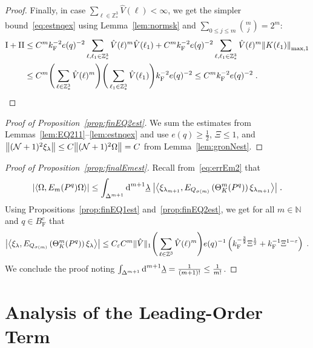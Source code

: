 \documentclass[12pt,a4paper]{article}
\numberwithin{equation}{section}
\newcommand{\1}{\mathbb{I}}
\newcommand{\di}{\textnormal{d}}
\newcommand{\F}{\mathrm{F}}
\newcommand{\I}{\mathrm{I}}
\newcommand{\II}{\mathrm{II}}
\newcommand{\Z}{\mathbb{Z}}
\newcommand{\NN}{\mathcal{N}}
\newcommand{\half}{\frac{1}{2}}
\newcommand{\eva}[1]{\left\langle #1 \right\rangle}
\theoremstyle{plain}
\theoremstyle{definition}
\theoremstyle{remark}
\theoremstyle{plain}
\theoremstyle{definition}
\theoremstyle{remark}
\begin{document}
\begin{proof}
Finally, in case $ \sum_{\ell \in \Z^3_*} \hat{V}(\ell) < \infty $, we get the simpler bound~\eqref{eq:estnqex} using Lemma~\ref{lem:normsk} and $ \sum_{0 \le j \le m} {{m}\choose j} = 2^m $:
\begin{align}
	\I + \II
	&\leq C^m k_{\F}^{-2} e(q)^{-2} \sum_{\ell,\ell_1 \in \Z^3_*}
		\hat{V}(\ell)^m
		\hat{V}(\ell_1)
	+ C^m k_{\F}^{-2} e(q)^{-2} \sum_{\ell,\ell_1 \in \Z^3_*}
		\hat{V}(\ell)^m
		\norm{K(\ell_1)}_{\max,1} \nonumber\\
	&\leq C^m
		\Bigg( \sum\limits_{\ell \in \Z^3_*} \hat{V}(\ell)^m \Bigg)
		\Bigg( \sum\limits_{\ell_1 \in \Z^3_*} \hat{V}(\ell_1) \Bigg)
		k_{\F}^{-2} e(q)^{-2}
	\leq C^m k_{\F}^{-2} e(q)^{-2} \;.
\end{align}
\end{proof}



\begin{proof}[Proof of Proposition~\ref{prop:finEQ2est}]
We sum the estimates from Lemmas~\ref{lem:EQ211}--\ref{lem:estnqex} and use $ e(q) \ge \half $, $ \Xi \le 1 $, and $ \norm{(\NN+1)^2 \xi_\lambda} \le C \norm{(\NN+1)^2 \Omega} = C $ from Lemma~\ref{lem:gronNest}.
\end{proof}



\begin{proof}[Proof of Proposition~\ref{prop:finalEmest}]
Recall from~\eqref{eq:errEm2} that
\begin{equation}
	\abs{\eva{\Omega, E_m(P^q) \Omega }}
	\le \int_{\Delta^{m+1}} \di^{m+1}\underline{\lambda} \;
		\abs{\eva{\xi_{\lambda_{m+1}}, E_{Q_{\sigma(m)}}\left(\Theta^{m}_{K}(P^q)\right) \xi_{\lambda_{m+1}}}} \;.
\end{equation}		
Using Propositions~\ref{prop:finEQ1est} and~\ref{prop:finEQ2est}, we get for all $ m \in \mathbb{N} $ and $ q \in B_{\F}^c $ that
\begin{equation}
	\abs{\eva{\xi_\lambda, E_{Q_{\sigma(m)}}\left(\Theta^{m}_{K}(P^q)\right) \xi_\lambda}}
	\le C_\varepsilon C^m \Vert \hat{V} \Vert_1
		\Bigg( \sum_{\ell \in \Z^3} \hat{V}(\ell)^m \Bigg)
		e(q)^{-1} \left( k_{\F}^{-\frac{3}{2}} \Xi^\half
		+ k_{\F}^{-1}\Xi^{1-\varepsilon} \right) \;.
\end{equation}
We conclude the proof noting $ \int_{\Delta^{m+1}} \di^{m+1} \underline{\lambda} = \frac{1}{(m+1)!} \le \frac{1}{m!} $.
\end{proof}



\section{Analysis of the Leading-Order Term}
\label{sec:leading_order_analysis}
\end{document}
